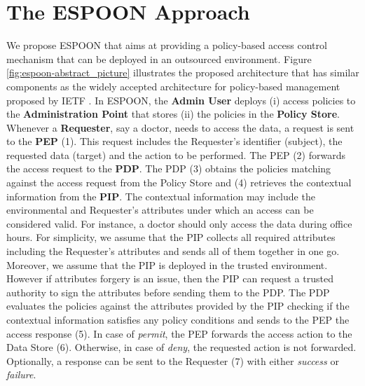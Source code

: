 \documentclass[epsfig,a4paper,11pt,titlepage]{book}
\numberwithin{algorithm}{chapter}
\begin{document}
\section[The ESPOON Approach]{The \gls{ESPOON} Approach}
\label{sec:espoon-proposed-approach}
We propose \acrfull{ESPOON} that aims at providing a policy-based access control mechanism that can be deployed in an outsourced environment. Figure \ref{fig:espoon-abstract_picture} illustrates the proposed architecture that has similar components as the widely accepted architecture for policy-based management proposed by \gls{IETF} \cite{Yavatkar:2000}. In \gls{ESPOON}, the \textbf{Admin User} deploys (i) access policies to the \textbf{Administration Point} that stores (ii) the policies in the \textbf{Policy Store}. Whenever a \textbf{Requester}, say a doctor, needs to access the data, a request is sent to the \textbf{\gls{PEP}} (1). This request includes the Requester's identifier (subject), the requested data (target) and the action to be performed. The \gls{PEP} (2) forwards the access request to the \textbf{\gls{PDP}}. The \gls{PDP} (3) obtains the policies matching against the access request from the Policy Store and (4) retrieves the contextual information from the \textbf{\gls{PIP}}. The contextual information may include the environmental and Requester's attributes under which an access can be considered valid. For instance, a doctor should only access the data during office hours. For simplicity, we assume that the \gls{PIP} collects all required attributes including the Requester's attributes and sends all of them together in one go. Moreover, we assume that the \gls{PIP} is deployed in the trusted environment. However if attributes forgery is an issue, then the \gls{PIP} can request a trusted authority to sign the attributes before sending them to the \gls{PDP}. The \gls{PDP} evaluates the policies against the attributes provided by the \gls{PIP} checking if the contextual information satisfies any policy conditions and sends to the \gls{PEP} the access response (5). In case of \emph{permit}, the \gls{PEP} forwards the access action to the Data Store (6). Otherwise, in case of \emph{deny}, the requested action is not forwarded. Optionally, a response can be sent to the Requester (7) with either \emph{success} or \emph{failure}.
\end{document}
